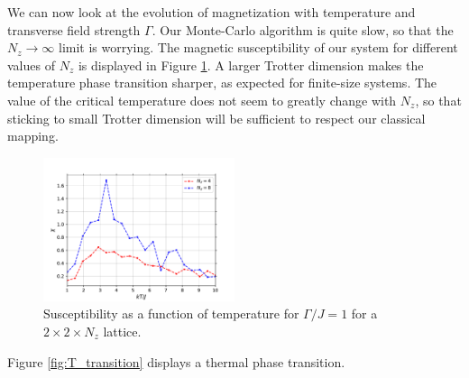 \documentclass[11pt,openany]{article}
\begin{document}
We can now look at the evolution of magnetization with temperature and transverse field strength $\Gamma$. Our Monte-Carlo algorithm is quite slow, so that the $N_z\to \infty$ limit is worrying. The magnetic susceptibility of our system for different values of $N_z$ is displayed in Figure \ref{fig:transition_chi_nz}. A larger Trotter dimension makes the temperature phase transition sharper, as expected for finite-size systems. The value of the critical temperature does not seem to greatly change with $N_z$, so that sticking to small Trotter dimension will be sufficient to respect our classical mapping.

\begin{figure}[H]
	\centering
	\includegraphics[width=0.5\textwidth]{Plots/T_transition_chi_nz.pdf}
	\caption{Susceptibility as a function of temperature for $\Gamma/J=1$ for a $2\times2\times N_z$ lattice.}
	\label{fig:transition_chi_nz}
\end{figure}

Figure \ref{fig:T_transition} displays a thermal phase transition.
 
\end{document}
